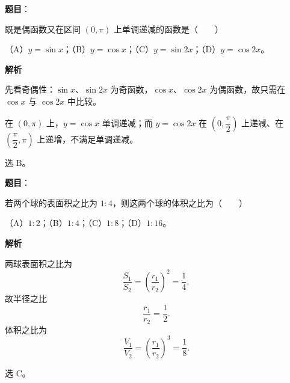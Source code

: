 \begin{answer}

\textbf{题目}：

既是偶函数又在区间 $(0,\pi)$ 上单调递减的函数是\mbox{（　　）}

（A）$y=\sin x$；（B）$y=\cos x$；（C）$y=\sin 2x$；（D）$y=\cos 2x$。

\textbf{解析}

先看奇偶性：$\sin x$、$\sin2x$ 为奇函数，$\cos x$、$\cos2x$ 为偶函数，故只需在 $\cos x$ 与 $\cos2x$ 中比较。

在 $(0,\pi)$ 上，$y=\cos x$ 单调递减；而 $y=\cos2x$ 在 $\left(0,\dfrac\pi2\right)$ 上递减、在 $\left(\dfrac\pi2,\pi\right)$ 上递增，不满足单调递减。

选 B。


\end{answer}
\begin{answer}

\textbf{题目}：

若两个球的表面积之比为 $1:4$，则这两个球的体积之比为\mbox{（　　）}

（A）$1:2$；（B）$1:4$；（C）$1:8$；（D）$1:16$。

\textbf{解析}

两球表面积之比为
\nopagebreak[4]
\[\frac{S_1}{S_2}=\left(\frac{r_1}{r_2}\right)^2=\frac14,\]
故半径之比
\nopagebreak[4]
\[\frac{r_1}{r_2}=\frac12.\]
体积之比为
\nopagebreak[4]
\[\frac{V_1}{V_2}=\left(\frac{r_1}{r_2}\right)^3=\frac18.\]

选 C。


\end{answer}
